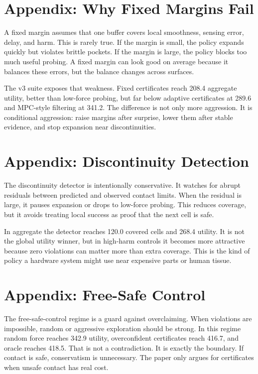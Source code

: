 \documentclass{article}
\begin{document}
\section{Appendix: Why Fixed Margins Fail}

A fixed margin assumes that one buffer covers local smoothness, sensing error,
delay, and harm. This is rarely true. If the margin is small, the policy
expands quickly but violates brittle pockets. If the margin is large, the
policy blocks too much useful probing. A fixed margin can look good on average
because it balances these errors, but the balance changes across surfaces.

The v3 suite exposes that weakness. Fixed certificates reach 208.4 aggregate
utility, better than low-force probing, but far below adaptive certificates at
289.6 and MPC-style filtering at 341.2. The difference is not only more
aggression. It is conditional aggression: raise margins after surprise, lower
them after stable evidence, and stop expansion near discontinuities.

\section{Appendix: Discontinuity Detection}

The discontinuity detector is intentionally conservative. It watches for abrupt
residuals between predicted and observed contact limits. When the residual is
large, it pauses expansion or drops to low-force probing. This reduces
coverage, but it avoids treating local success as proof that the next cell is
safe.

In aggregate the detector reaches 120.0 covered cells and 268.4 utility. It is
not the global utility winner, but in high-harm controls it becomes more
attractive because zero violations can matter more than extra coverage. This is
the kind of policy a hardware system might use near expensive parts or human
tissue.

\section{Appendix: Free-Safe Control}

The free-safe-control regime is a guard against overclaiming. When violations
are impossible, random or aggressive exploration should be strong. In this
regime random force reaches 342.9 utility, overconfident certificates reach
416.7, and oracle reaches 418.5. That is not a contradiction. It is exactly the
boundary. If contact is safe, conservatism is unnecessary. The paper only
argues for certificates when unsafe contact has real cost.
\end{document}
